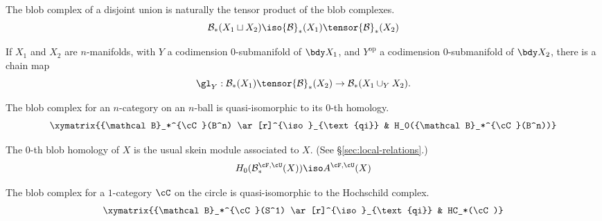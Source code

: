 \documentclass[11pt,leqno]{amsart}
\def\bc{{\mathcal B}}
\begin{document}
\begin{property}
\label{property:disjoint-union}
The blob complex of a disjoint union is naturally the tensor product of the blob complexes.
\begin{equation*}
\bc_*(X_1 \sqcup X_2) \iso \bc_*(X_1) \tensor \bc_*(X_2)
\end{equation*}
\end{property}

\begin{property}
\label{property:gluing-map}%
If $X_1$ and $X_2$ are $n$-manifolds, with $Y$ a codimension $0$-submanifold of $\bdy X_1$, and $Y^{\text{op}}$ a codimension $0$-submanifold of $\bdy X_2$,
there is a chain map
\begin{equation*}
\gl_Y: \bc_*(X_1) \tensor \bc_*(X_2) \to \bc_*(X_1 \cup_Y X_2).
\end{equation*}
\end{property}

\begin{property}[Contractibility]
\label{property:contractibility}%
The blob complex for an $n$-category on an $n$-ball is quasi-isomorphic to its $0$-th homology.
\begin{equation}
\xymatrix{\bc_*^{\cC}(B^n) \ar[r]^{\iso}_{\text{qi}} & H_0(\bc_*^{\cC}(B^n))}
\end{equation}
\end{property}

\begin{property}
\label{property:skein-modules}%
The $0$-th blob homology of $X$ is the usual skein module associated to $X$. (See \S \ref{sec:local-relations}.)
\begin{equation*}
H_0(\bc_*^{\cF,\cU}(X)) \iso A^{\cF,\cU}(X)
\end{equation*}
\end{property}

\begin{property}[Hochschild homology when $X=S^1$]
\label{property:hochschild}%
The blob complex for a $1$-category $\cC$ on the circle is
quasi-isomorphic to the Hochschild complex.
\begin{equation*}
\xymatrix{\bc_*^{\cC}(S^1) \ar[r]^{\iso}_{\text{qi}} & HC_*(\cC)}
\end{equation*}
\end{property}
\end{document}
